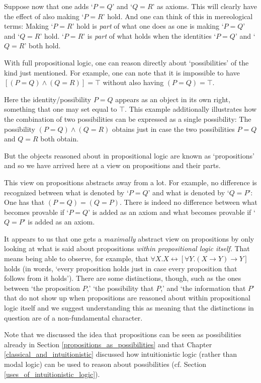 \documentclass[12pt]{book}
\begin{document}
Suppose now that one adds `$P = Q$' and `$Q = R$' as axioms. This will clearly have the effect of also making `$P = R$' hold. And one can think of this in mereological terms: Making `$P = R$' hold is \textit{part} of what one does as one is making `$P = Q$' and `$Q = R$' hold. `$P = R$' is \textit{part} of what holds when the identities `$P = Q$' and `$Q = R$' both hold.

With full propositional logic, one can reason directly about `possibilities' of the kind just mentioned. For example, one can note that it is impossible to have $[(P = Q) \wedge (Q = R)] = \top$ without also having $(P = Q) = \top$.

Here the identity/possibility $P = Q$ appears as an object in its own right, something that one may set equal to $\top$. This example additionally illustrates how the combination of two possibilities can be expressed as a single possibility: The possibility $(P = Q) \wedge (Q = R)$ obtains just in case the two possibilities $P = Q$ and $Q = R$ both obtain.

But the objects reasoned about in propositional logic are known as `propositions' and so we have arrived here at a view on propositions and their parts.

This view on propositions abstracts away from a lot. For example, no difference is recognized between what is denoted by `$P = Q$' and what is denoted by `$Q = P$': One has that $(P = Q) = (Q = P)$. There is indeed no difference between what becomes provable if `$P = Q$' is added as an axiom and what becomes provable if `$Q = P$' is added as an axiom.

It appears to us that one gets a \textit{maximally} abstract view on propositions by only looking at what is said about propositions \textit{within propositional logic itself}. That means being able to observe, for example, that $\forall X.X \leftrightarrow [\forall Y. (X \rightarrow Y) \rightarrow Y]$ holds (in words, `every proposition holds just in case every proposition that follows from it holds'). There are some distinctions, though, such as the ones between `the proposition $P$,' `the possibility that $P$,' and `the information that $P$' that do not show up when propositions are reasoned about within propositional logic itself and we suggest understanding this as meaning that the distinctions in question are of a non-fundamental character.

Note that we discussed the idea that propositions can be seen as possibilities already in Section \ref{propositions_as_possibilities} and that Chapter \ref{classical_and_intuitionistic} discussed how intuitionistic logic (rather than modal logic) can be used to reason about possibilities (cf. Section \ref{uses_of_intuitionistic_logic}).
\end{document}
